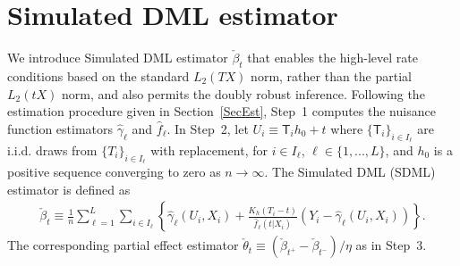 \documentclass[lettersize, 12pt]{article}
\begin{document}
\section{Simulated DML estimator}
\label{SecSDML}
We introduce Simulated DML estimator $\check\beta_t$ that 
enables the high-level rate conditions based on the standard $L_2(TX)$ norm, rather than the partial $L_2(tX)$ norm, and also permits the doubly robust inference.
Following the estimation procedure given in Section~\ref{SecEst}, Step~1 computes the nuisance function estimators $\hat \gamma_\ell$ and $\hat f_\ell$.
In Step~2, let $U_i \equiv \mathsf{T}_i h_0 + t$ 
where $\{\mathsf{T}_i\}_{i\in I_\ell}$ are i.i.d. draws from $\{T_i\}_{i\in I_\ell}$ with replacement, 
for $i \in I_\ell$, $\ell\in\{1,..., L\}$,
and $h_0$ is a positive sequence converging to zero as $n\rightarrow\infty$.
The Simulated DML (SDML) estimator is defined as 
\begin{align*}
\check \beta_t \equiv \frac{1}{n}\sum_{\ell=1}^L \sum_{i \in I_\ell} \left\{ \hat \gamma_\ell (U_i, X_i) + \frac{K_h(T_i - t)}{ \hat f_\ell(t|X_i)} \left( Y_i - \hat \gamma_\ell(U_i, X_i) \right)\right\}.
\end{align*}
The corresponding partial effect estimator $\check\theta_t \equiv (\check\beta_{t^+} -\check\beta_{t^-})/\eta$ as in Step~3.
\end{document}
